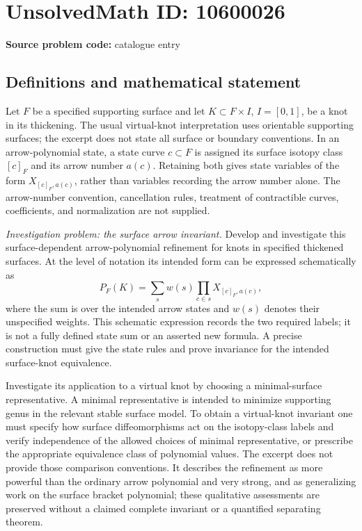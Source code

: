 \documentclass[11pt]{article}
\begin{document}
\section*{UnsolvedMath ID: 10600026}
\textbf{Source problem code:} catalogue entry
\subsection{Definitions and mathematical statement}
Let \(F\) be a specified supporting surface and let \(K\subset F\times I\), \(I=[0,1]\), be a knot in its thickening. The usual virtual-knot interpretation uses orientable supporting surfaces; the excerpt does not state all surface or boundary conventions. In an arrow-polynomial state, a state curve \(c\subset F\) is assigned its surface isotopy class \([c]_F\) and its arrow number \(a(c)\). Retaining both gives state variables of the form \(X_{[c]_F,a(c)}\), rather than variables recording the arrow number alone. The arrow-number convention, cancellation rules, treatment of contractible curves, coefficients, and normalization are not supplied.

\emph{Investigation problem: the surface arrow invariant.} Develop and investigate this surface-dependent arrow-polynomial refinement for knots in specified thickened surfaces. At the level of notation its intended form can be expressed schematically as
\[
 P_F(K)=\sum_{s}w(s)\prod_{c\in s}X_{[c]_F,a(c)},
\]
where the sum is over the intended arrow states and \(w(s)\) denotes their unspecified weights. This schematic expression records the two required labels; it is not a fully defined state sum or an asserted new formula. A precise construction must give the state rules and prove invariance for the intended surface-knot equivalence.

Investigate its application to a virtual knot by choosing a minimal-surface representative. A minimal representative is intended to minimize supporting genus in the relevant stable surface model. To obtain a virtual-knot invariant one must specify how surface diffeomorphisms act on the isotopy-class labels and verify independence of the allowed choices of minimal representative, or prescribe the appropriate equivalence class of polynomial values. The excerpt does not provide those comparison conventions. It describes the refinement as more powerful than the ordinary arrow polynomial and very strong, and as generalizing work on the surface bracket polynomial; these qualitative assessments are preserved without a claimed complete invariant or a quantified separating theorem.
\end{document}
